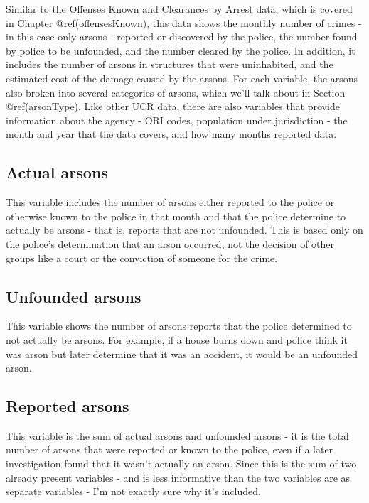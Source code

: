 \documentclass[
  12pt,
  openany]{book}
\begin{document}
Similar to the Offenses Known and Clearances by Arrest data, which is covered in Chapter @ref(offensesKnown), this data shows the monthly number of crimes - in this case only arsons - reported or discovered by the police, the number found by police to be unfounded, and the number cleared by the police. In addition, it includes the number of arsons in structures that were uninhabited, and the estimated cost of the damage caused by the arsons. For each variable, the arsons also broken into several categories of arsons, which we'll talk about in Section @ref(arsonType). Like other UCR data, there are also variables that provide information about the agency - ORI codes, population under jurisdiction - the month and year that the data covers, and how many months reported data.

\hypertarget{actual-arsons}{%
\subsection{Actual arsons}\label{actual-arsons}}

This variable includes the number of arsons either reported to the police or otherwise known to the police in that month and that the police determine to actually be arsons - that is, reports that are not unfounded. This is based only on the police's determination that an arson occurred, not the decision of other groups like a court or the conviction of someone for the crime.

\hypertarget{unfounded-arsons}{%
\subsection{Unfounded arsons}\label{unfounded-arsons}}

This variable shows the number of arsons reports that the police determined to not actually be arsons. For example, if a house burns down and police think it was arson but later determine that it was an accident, it would be an unfounded arson.

\hypertarget{reported-arsons}{%
\subsection{Reported arsons}\label{reported-arsons}}

This variable is the sum of actual arsons and unfounded arsons - it is the total number of arsons that were reported or known to the police, even if a later investigation found that it wasn't actually an arson. Since this is the sum of two already present variables - and is less informative than the two variables are as separate variables - I'm not exactly sure why it's included.
\end{document}
